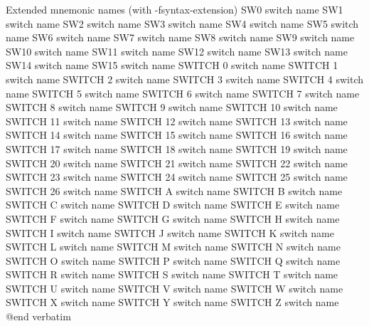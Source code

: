 Extended mnemonic names (with -fsyntax-extension)
SW0                             switch name
SW1                             switch name
SW2                             switch name
SW3                             switch name
SW4                             switch name
SW5                             switch name
SW6                             switch name
SW7                             switch name
SW8                             switch name
SW9                             switch name
SW10                            switch name
SW11                            switch name
SW12                            switch name
SW13                            switch name
SW14                            switch name
SW15                            switch name
SWITCH 0                        switch name
SWITCH 1                        switch name
SWITCH 2                        switch name
SWITCH 3                        switch name
SWITCH 4                        switch name
SWITCH 5                        switch name
SWITCH 6                        switch name
SWITCH 7                        switch name
SWITCH 8                        switch name
SWITCH 9                        switch name
SWITCH 10                       switch name
SWITCH 11                       switch name
SWITCH 12                       switch name
SWITCH 13                       switch name
SWITCH 14                       switch name
SWITCH 15                       switch name
SWITCH 16                       switch name
SWITCH 17                       switch name
SWITCH 18                       switch name
SWITCH 19                       switch name
SWITCH 20                       switch name
SWITCH 21                       switch name
SWITCH 22                       switch name
SWITCH 23                       switch name
SWITCH 24                       switch name
SWITCH 25                       switch name
SWITCH 26                       switch name
SWITCH A                        switch name
SWITCH B                        switch name
SWITCH C                        switch name
SWITCH D                        switch name
SWITCH E                        switch name
SWITCH F                        switch name
SWITCH G                        switch name
SWITCH H                        switch name
SWITCH I                        switch name
SWITCH J                        switch name
SWITCH K                        switch name
SWITCH L                        switch name
SWITCH M                        switch name
SWITCH N                        switch name
SWITCH O                        switch name
SWITCH P                        switch name
SWITCH Q                        switch name
SWITCH R                        switch name
SWITCH S                        switch name
SWITCH T                        switch name
SWITCH U                        switch name
SWITCH V                        switch name
SWITCH W                        switch name
SWITCH X                        switch name
SWITCH Y                        switch name
SWITCH Z                        switch name
@end verbatim

